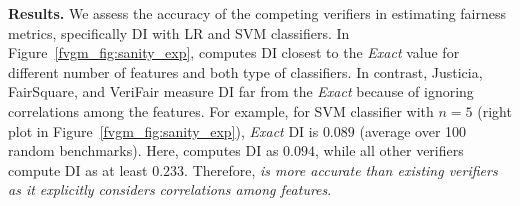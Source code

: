 \textbf{Results.} 
 We  assess the accuracy of the competing verifiers in estimating fairness metrics, specifically DI with LR and SVM classifiers. In Figure~\ref{fvgm_fig:sanity_exp}, {\fvgm} computes DI closest to the \textit{Exact} value for different number of features and both type of classifiers. In contrast, Justicia, FairSquare, and VeriFair measure DI far from the \textit{Exact} because of ignoring correlations among the features. For example, for SVM classifier with  $ n = 5 $ (right plot in Figure~\ref{fvgm_fig:sanity_exp}), \textit{Exact} DI is $ 0.089 $ (average over 100 random benchmarks). Here, {\fvgm} computes DI as $ 0.094 $, while all other verifiers compute DI as at least $ 0.233 $. Therefore, \textit{{\fvgm} is more accurate than existing verifiers as it explicitly considers correlations among features}. 








